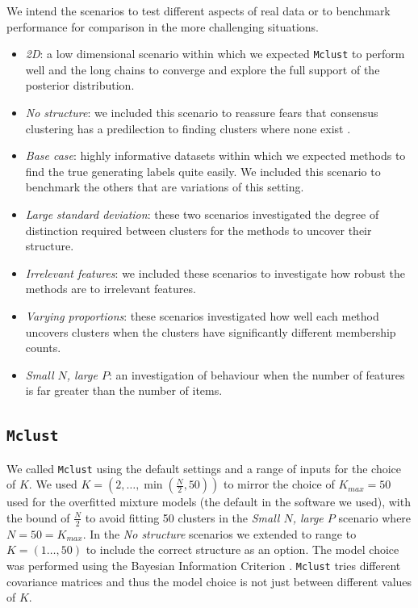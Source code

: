\documentclass[]{article}
\begin{document}
We intend the scenarios to test different aspects of real data or to benchmark performance for comparison in the more challenging situations.
\begin{itemize}
	\item \emph{2D}: a low dimensional scenario within which we expected \texttt{Mclust} to perform well and the long chains to converge and explore the full support of the posterior distribution.
	\item \emph{No structure}: we included this scenario to reassure fears that consensus clustering has a predilection to finding clusters where none exist \citep{senbabaoglu2014reassessment,senbabaouglu2014critical}.
	\item \emph{Base case}: highly informative datasets within which we expected methods to find the true generating labels quite easily. We included this scenario to benchmark the others that are variations of this setting.
	\item \emph{Large standard deviation}: these two scenarios investigated the degree of distinction required between clusters for the methods to uncover their structure.
	\item \emph{Irrelevant features}: we included these scenarios to investigate how robust the methods are to irrelevant features.
	\item \emph{Varying proportions}: these scenarios investigated how well each method uncovers clusters when the clusters have significantly different membership counts.
	\item \emph{Small $N$, large $P$}: an investigation of behaviour when the number of features is far greater than the number of items.
\end{itemize}

\subsection{\texttt{Mclust}}
We called \texttt{Mclust} using the default settings and a range of inputs for the choice of $K$. We used $K = (2, \ldots, \min(\frac{N}{2}, 50))$ to mirror the choice of $K_{max}=50$ used for the overfitted mixture models (the default in the software we used), with the bound of $\frac{N}{2}$ to avoid fitting 50 clusters in the \emph{Small $N$, large $P$} scenario where $N=50=K_{max}$. In the \emph{No structure} scenarios we extended to range to $K = (1 \ldots, 50)$ to include the correct structure as an option. The model choice was performed using the Bayesian Information Criterion \citep[][as implemented in \texttt{Mclust}]{schwarz1978estimating}. \texttt{Mclust} tries different covariance matrices and thus the model choice is not just between different values of $K$.
\end{document}
